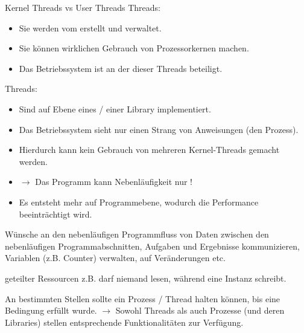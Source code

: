 \documentclass[12pt, aspectratio=169, usepdftitle=false, handout]{beamer}
\begin{document}
\begin{frame}[fragile]{Kernel Threads vs User Threads}
        \pause
		 Threads:
		\pause
		\begin{itemize}
			\item Sie werden vom  erstellt und verwaltet.
			\pause
			\item Sie können wirklichen Gebrauch von  Prozessorkernen machen.
			\pause
			\item Das Betriebssystem ist an der  dieser Threads beteiligt.
		\end{itemize}
		\pause
		\medskip
		\pause
		 Threads:  
		\begin{itemize}
			\pause
			\item Sind auf Ebene eines  / einer Library implementiert.
			\pause
			\item Das Betriebssystem sieht nur einen Strang von Anweisungen (den Prozess). 
			\item[] Hierdurch kann kein Gebrauch von mehreren Kernel-Threads gemacht werden.
			\pause
			\item[] $\rightarrow$ Das Programm kann Nebenläufigkeit nur !
			\pause
			\item Es entsteht mehr  auf Programmebene, wodurch die Performance beeinträchtigt wird.
		\end{itemize}

\end{frame}

\begin{frame}[fragile]{Wünsche an den nebenläufigen Programmfluss}
         von Daten zwischen den nebenläufigen Programmabschnitten,\newline
		Aufgaben und Ergebnisse kommunizieren,  Variablen (z.B. Counter) verwalten, auf Veränderungen  etc.
		
		\medskip
		
		 geteilter Ressourcen\newline
		z.B. darf niemand lesen, während eine Instanz schreibt.
		
		\medskip
		
		\newline
		An bestimmten Stellen sollte ein Prozess / Thread halten können, bis eine Bedingung erfüllt wurde.
		\newline
		$\rightarrow$ Sowohl Threads als auch Prozesse (und deren Libraries) stellen entsprechende Funktionalitäten zur Verfügung.

\end{frame}
\end{document}
